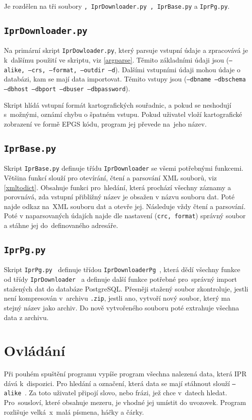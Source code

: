 Je rozdělen na tři soubory 
{\tt , IprDownloader.py , IprBase.py} a {\tt IprPg.py}.


\subsection{{\tt IprDownloader.py}}
Na primární skript {\tt IprDowloader.py}, který parsuje vstupní údaje a
zpracovává je k~dalšímu použití ve skriptu, viz \ref{argparse}. Těmito
základními údaji jsou
({\tt ---alike, ---crs, ---format, ---outdir ---d}).
Dalšími vstupními údaji mohou údaje o databázi, kam se mají data
importovat. Těmito vstupy jsou
({\tt ---dbname ---dbschema ---dbhost ---dbport ---dbuser ---dbpassword}).

Skript hlídá vstupní formát kartografických souřadnic, a pokud se
neshodují s~možnými, oznámí chybu o špatném vstupu. Pokud uživatel
vloží kartografické zobrazení ve formě EPGS kódu, program jej převede
na~jeho název.


\subsection{{\tt IprBase.py}}
Skript {\tt IprBase.py} definuje třídu {\tt IprDownloader} se všemi
potřebnými funkcemi. Většina funkcí slouží pro otevírání, čtení a
parsování XML souborů, viz \ref{xmltodict}. Obsahuje funkci
pro~hledání, která prochází všechny záznamy a porovnává, zda vstupní
přibližný název je obsažen v názvu souboru dat. Poté najde odkaz
na~XML souboru dat a otevře jej. Následuje vždy čtení a parsování.
Poté v naparsovaných údajích najde dle nastavení ({\tt crc, format})
správný soubor a stáhne jej do~definovaného adresáře.


\subsection{{\tt IprPg.py}}
Skript {\tt IprPg.py } definuje třídou {\tt IprDownloaderPg }, která
dědí všechny funkce od třídy {\tt IprDownloader } a definuje další
funkce potřebné pro~správný import stažených dat do databáze
PostgreSQL. Přesněji stažený soubor zkontroluje, jestli není 
kompresován v~archivu {\tt *.zip}, jestli ano, vytvoří nový soubor,
který ma stejný název jako archiv. Do nově vytvořeného souboru poté 
extrahuje všechna data z archivu.


\section{Ovládání}
Při pouhém spuštění programu vypíše program všechna nalezená data,
která IPR dává k~dispozici. Pro hledání a označení, která data se mají
stáhnout slouží {\tt ---alike }. Za toto uživatel připojí slovo, nebo
frázi, jež chce v~datech hledat. Pro~sousloví, které obsahuje mezeru,
je vhodné jej umístit do uvozovek. Program rozlišuje velká~x~malá
písmena, háčky a čárky.

